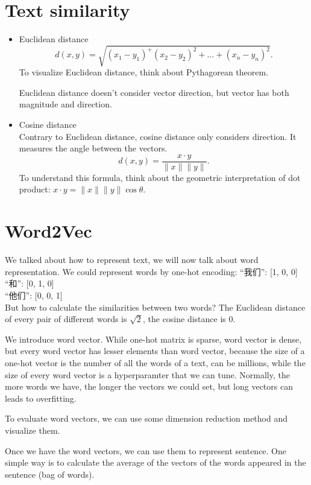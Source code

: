 \documentclass{report}
\begin{document}
\section{Text similarity}
\begin{itemize}
	\item Euclidean distance
		\[
		d(x, y) = \sqrt{(x_1 - y_1)^ + (x_2 - y_2)^2 + \ldots + (x_n - y_n)^2 } 
		.\] 
	To visualize Euclidean distance, think about Pythagorean theorem. 

	Euclidean distance doesn't consider vector direction, but vector has both magnitude and direction.
	\item Cosine distance\\
	Contrary to Euclidean distance, cosine distance only considers direction. It measures the angle between the vectors. \[
	d(x, y) = \frac{x \cdot y}{\|x\|\|y\|}
	.\] 
	To understand this formula, think about the geometric interpretation of dot product: $x \cdot y = \|x\|\|y\|\cos\theta$.
\end{itemize}

\section{Word2Vec}
We talked about how to represent text, we will now talk about word representation. We could represent words by one-hot encoding:
{\center
“我们”: [1, 0, 0]\\
“和”: [0, 1, 0]\\
“他们”: [0, 0, 1]\\}
But how to calculate the similarities between two words? The Euclidean distance of every pair of different words is $\sqrt{2} $, the cosine distance is $0$. 

We introduce word vector. While one-hot matrix is sparse, word vector is dense, but every word vector has lesser elements than word vector, because the size of a one-hot vector is the number of all the words of a text, can be millions, while the size of every word vector is a hyperparamter that we can tune. Normally, the more words we have, the longer the vectors we could set, but long vectors can leads to overfitting.

To evaluate word vectors, we can use some dimension reduction method and visualize them.

Once we have the word vectors, we can use them to represent sentence. One simple way is to calculate the average of the vectors of the words appeared in the sentence (bag of words).
\end{document}
